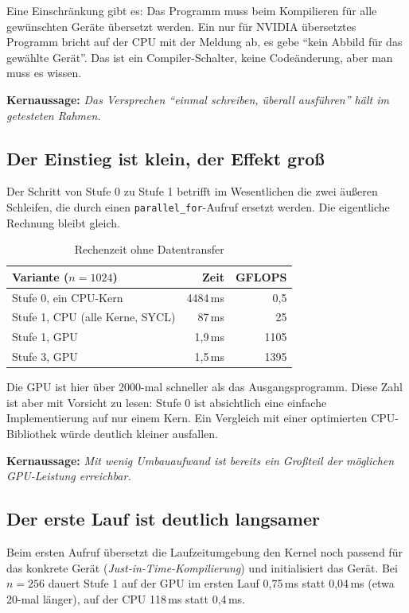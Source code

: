 \documentclass[11pt]{article}
\newcommand{\kernaussage}[1]{\par\smallskip\noindent\textbf{Kernaussage:} \emph{#1}\par\smallskip}
\begin{document}
Eine Einschränkung gibt es: Das Programm muss beim Kompilieren für alle
gewünschten Geräte übersetzt werden. Ein nur für NVIDIA übersetztes
Programm bricht auf der CPU mit der Meldung ab, es gebe \enquote{kein
Abbild für das gewählte Gerät}. Das ist ein Compiler-Schalter, keine
Codeänderung, aber man muss es wissen.

\kernaussage{Das Versprechen \enquote{einmal schreiben, überall ausführen} hält
im getesteten Rahmen.}

\subsection{Der Einstieg ist klein, der Effekt groß}

Der Schritt von Stufe 0 zu Stufe 1 betrifft im Wesentlichen die zwei
äußeren Schleifen, die durch einen \texttt{parallel\_for}-Aufruf ersetzt
werden. Die eigentliche Rechnung bleibt gleich.

\begin{table}[h]
\centering
\begin{tabular}{@{}lrr@{}}
\toprule
\textbf{Variante ($n = 1024$)} & \textbf{Zeit} & \textbf{GFLOPS} \\
\midrule
Stufe 0, ein CPU-Kern & 4484\,ms & 0{,}5 \\
Stufe 1, CPU (alle Kerne, SYCL) & 87\,ms & 25 \\
Stufe 1, GPU & 1{,}9\,ms & 1105 \\
Stufe 3, GPU & 1{,}5\,ms & 1395 \\
\bottomrule
\end{tabular}
\caption{Rechenzeit ohne Datentransfer}
\end{table}

Die GPU ist hier über 2000-mal schneller als das Ausgangsprogramm. Diese
Zahl ist aber mit Vorsicht zu lesen: Stufe 0 ist absichtlich eine
einfache Implementierung auf nur einem Kern. Ein Vergleich mit einer
optimierten CPU-Bibliothek würde deutlich kleiner ausfallen.

\kernaussage{Mit wenig Umbauaufwand ist bereits ein Großteil der möglichen
GPU-Leistung erreichbar.}

\subsection{Der erste Lauf ist deutlich langsamer}

Beim ersten Aufruf übersetzt die Laufzeitumgebung den Kernel noch
passend für das konkrete Gerät (\emph{Just-in-Time-Kompilierung}) und
initialisiert das Gerät. Bei $n = 256$ dauert Stufe 1 auf der GPU im
ersten Lauf 0{,}75\,ms statt 0{,}04\,ms (etwa 20-mal länger), auf der CPU
118\,ms statt 0{,}4\,ms.
\end{document}
